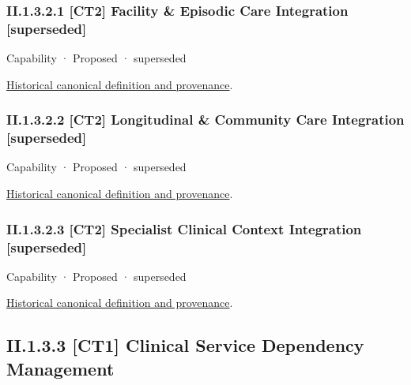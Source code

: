 \subsubsection*{II.1.3.2.1 [CT2] Facility \& Episodic Care Integration [superseded]}
\label{navigation:II.1.3.2.1}

\label{element:c1eb24ed7e36417cb426288ff57512c0}
{\small Capability · Proposed · superseded}\par
\href{../../../../continuum/strategy/capability/c1eb24ed7e36417cb426288ff57512c0.md}{Historical canonical definition and provenance}.\par
\subsubsection*{II.1.3.2.2 [CT2] Longitudinal \& Community Care Integration [superseded]}
\label{navigation:II.1.3.2.2}

\label{element:8430d50adc504ecc959f15b7cbbcd095}
{\small Capability · Proposed · superseded}\par
\href{../../../../continuum/strategy/capability/8430d50adc504ecc959f15b7cbbcd095.md}{Historical canonical definition and provenance}.\par
\subsubsection*{II.1.3.2.3 [CT2] Specialist Clinical Context Integration [superseded]}
\label{navigation:II.1.3.2.3}

\label{element:062802a425d14530b0ce9434c5980d85}
{\small Capability · Proposed · superseded}\par
\href{../../../../continuum/strategy/capability/062802a425d14530b0ce9434c5980d85.md}{Historical canonical definition and provenance}.\par
\subsection*{II.1.3.3 [CT1] Clinical Service Dependency Management}
\label{navigation:II.1.3.3}

